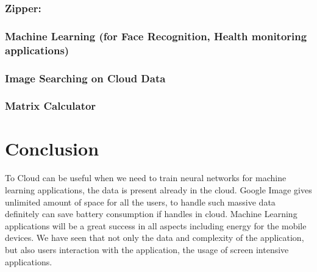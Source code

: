 \documentclass[12pt]{report}
\begin{document}
\subsection{Zipper:}
\subsection{Machine Learning (for Face Recognition, Health monitoring applications)}
\subsection{Image Searching on Cloud Data}
\subsection{Matrix Calculator}

\chapter{Conclusion}
To Cloud can be useful when we need to train neural networks for machine learning applications, the data is present already in the cloud. Google Image gives unlimited amount of space for all the users, to handle such massive data definitely can save battery consumption if handles in cloud. Machine Learning applications will be a great success in all aspects including energy for the mobile devices. We have seen that not only the data and complexity of the application, but also users interaction with the application, the usage of screen intensive applications.


\end{document}
